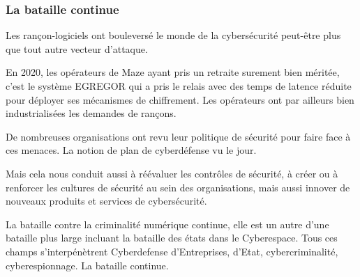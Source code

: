 \subsubsection{La bataille continue}

Les rançon-logiciels ont bouleversé le monde de la cybersécurité peut-être plus que tout autre vecteur d'attaque.

En 2020, les opérateurs de Maze ayant pris un retraite surement bien méritée, c'est le système EGREGOR qui a pris le relais avec des temps de latence réduite pour déployer ses mécanismes de chiffrement. Les opérateurs ont par ailleurs bien industrialisées les demandes de rançons.

De nombreuses organisations ont revu leur politique de sécurité pour faire face à ces menaces. La notion de plan de cyberdéfense  vu le jour. 

Mais cela nous  conduit aussi à réévaluer les contrôles de sécurité, à créer ou à renforcer les cultures de sécurité au sein des organisations, mais aussi innover de nouveaux produits et services de cybersécurité.

La bataille contre la criminalité numérique continue, elle est un autre d'une bataille plus large incluant la bataille des états dans le Cyberespace. Tous ces champs s'interpénètrent Cyberdefense d'Entreprises, d'Etat, cybercriminalité,  cyberespionnage. La bataille continue. 



